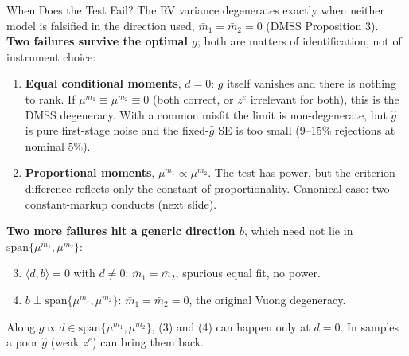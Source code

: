 \documentclass[aspectratio=169,10pt]{beamer}
\begin{document}
\begin{frame}{When Does the Test Fail?}
\footnotesize
The RV variance degenerates exactly when \alert{neither} model is falsified in the direction used, $\bar m_1 = \bar m_2 = 0$ (DMSS Proposition 3).\\[0.15cm]
\textbf{Two failures survive the optimal $g$}; both are matters of identification, not of instrument choice:
\begin{enumerate}
\item \textbf{Equal conditional moments}, $d = 0$: $g$ itself vanishes and there is nothing to rank. If $\mu^{m_1} \equiv \mu^{m_2} \equiv 0$ (both correct, or $z^e$ irrelevant for both), this is the DMSS degeneracy. With a common misfit the limit is non-degenerate, but $\widehat g$ is pure first-stage noise and the fixed-$\widehat g$ SE is too small (9--15\% rejections at nominal 5\%).
\item \textbf{Proportional moments}, $\mu^{m_1} \propto \mu^{m_2}$. The test has power, but the criterion difference reflects only the constant of proportionality. Canonical case: two constant-markup conducts (next slide).
\end{enumerate}
\textbf{Two more failures hit a generic direction $b$}, which need not lie in $\text{span}\{\mu^{m_1}, \mu^{m_2}\}$:
\begin{enumerate}
\setcounter{enumi}{2}
\item $\langle d, b \rangle = 0$ with $d \neq 0$: $\bar m_1 = \bar m_2$, spurious equal fit, no power.
\item $b \perp \text{span}\{\mu^{m_1}, \mu^{m_2}\}$: $\bar m_1 = \bar m_2 = 0$, the original Vuong degeneracy.
\end{enumerate}
Along $g \propto d \in \text{span}\{\mu^{m_1}, \mu^{m_2}\}$, (3) and (4) can happen only at $d = 0$. In samples a poor $\widehat g$ (weak $z^e$) can bring them back.
\end{frame}
\end{document}
